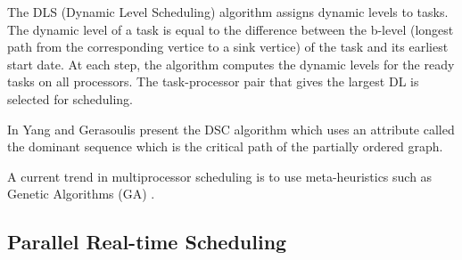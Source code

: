 The DLS (Dynamic Level Scheduling) algorithm \cite{sih:1993} assigns dynamic levels to tasks. The dynamic level of a task is equal to the difference between the b-level (longest path from the corresponding vertice to a sink vertice) of the task and its earliest start date. At each step, the algorithm computes the dynamic levels for the ready tasks on all processors. The task-processor pair that gives the largest DL is selected for scheduling. 

In \cite{yang:1994} Yang and Gerasoulis present the DSC algorithm which uses an attribute called the dominant sequence which is the critical path of the partially ordered graph.

A current trend in multiprocessor scheduling is to use meta-heuristics such as Genetic Algorithms (GA) \cite{hou:1994, wu:2004, omara:2010}.

\subsection{Parallel Real-time Scheduling}

